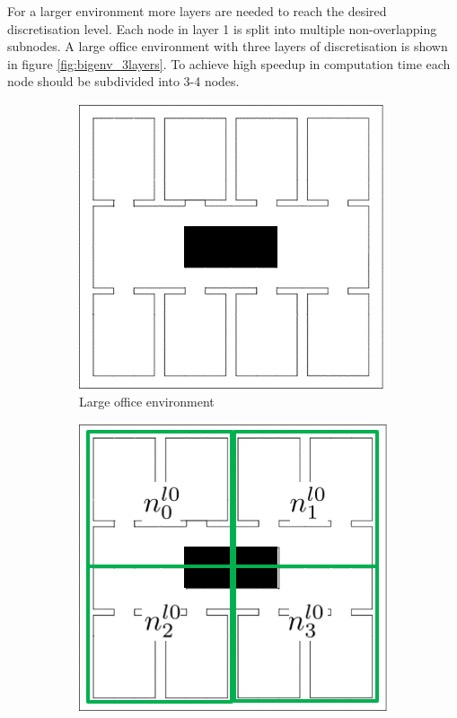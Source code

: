 For a larger environment more layers are needed to reach the desired discretisation level. Each node in layer 1 is split into multiple non-overlapping subnodes. A large office environment with three layers of discretisation is shown in figure \ref{fig:bigenv_3layers}. To achieve high speedup in computation time each node should be subdivided into 3-4 nodes. 
\begin{figure}
    \centering
    \begin{subfigure}[b]{0.23\textwidth}
        \includegraphics[width=\textwidth]{Report/images/Bilda.png}
        \caption[t]{Large office environment}
        \label{subfig:bigenv}
    \end{subfigure}
    \hfill
    \begin{subfigure}[b]{0.23\textwidth}
        \includegraphics[width=\textwidth]{Report/images/Bildb.png}

\end{subfigure}
\end{figure}
